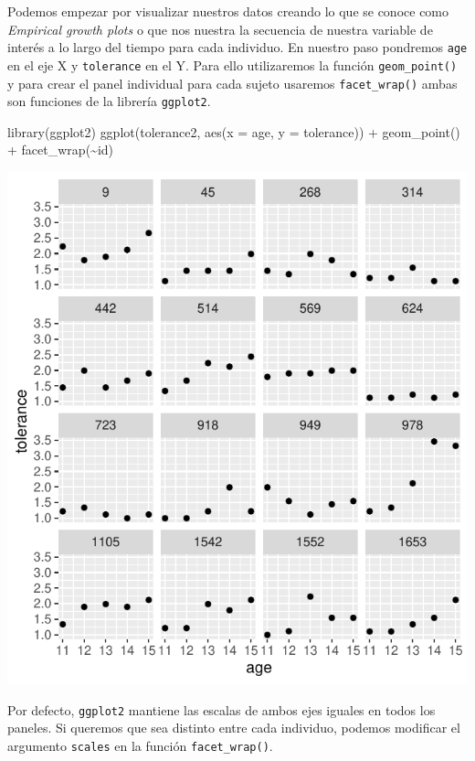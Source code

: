 \documentclass[
]{book}
\newenvironment{Shaded}{\begin{snugshade}}{\end{snugshade}}
\newcommand{\AttributeTok}[1]{\textcolor[rgb]{0.77,0.63,0.00}{#1}}
\newcommand{\FunctionTok}[1]{\textcolor[rgb]{0.00,0.00,0.00}{#1}}
\newcommand{\NormalTok}[1]{#1}
\newcommand{\SpecialCharTok}[1]{\textcolor[rgb]{0.00,0.00,0.00}{#1}}
\begin{document}
Podemos empezar por visualizar nuestros datos creando lo que se conoce como \emph{Empirical growth plots} o que nos nuestra la secuencia de nuestra variable de interés a lo largo del tiempo para cada individuo. En nuestro paso pondremos \texttt{age} en el eje X y \texttt{tolerance} en el Y. Para ello utilizaremos la función \texttt{geom\_point()} y para crear el panel individual para cada sujeto usaremos \texttt{facet\_wrap()} ambas son funciones de la librería \texttt{ggplot2}.

\begin{Shaded}
\begin{Highlighting}[]
\FunctionTok{library}\NormalTok{(ggplot2)}
\FunctionTok{ggplot}\NormalTok{(tolerance2, }\FunctionTok{aes}\NormalTok{(}\AttributeTok{x =}\NormalTok{ age, }\AttributeTok{y =}\NormalTok{ tolerance)) }\SpecialCharTok{+}
  \FunctionTok{geom\_point}\NormalTok{() }\SpecialCharTok{+}
  \FunctionTok{facet\_wrap}\NormalTok{(}\SpecialCharTok{\textasciitilde{}}\NormalTok{id)}
\end{Highlighting}
\end{Shaded}

\includegraphics{fig_out/unnamed-chunk-35-1.pdf}

Por defecto, \texttt{ggplot2} mantiene las escalas de ambos ejes iguales en todos los paneles. Si queremos que sea distinto entre cada individuo, podemos modificar el argumento \texttt{scales} en la función \texttt{facet\_wrap()}.
\end{document}
